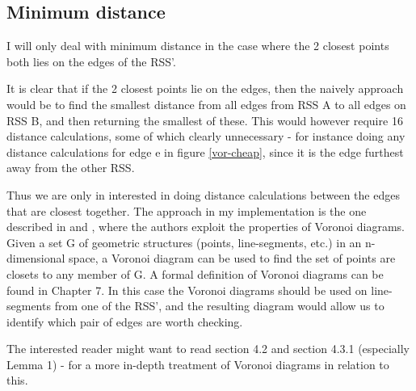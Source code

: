 \subsection{Minimum distance}
\label{minimumDistance}
I will only deal with minimum distance in the case where the 2 closest points both lies on the edges of the RSS'.

It is clear that if the 2 closest points lie on the edges, then the naively approach would be to find the smallest distance from all edges from RSS A to all edges on RSS B, and then returning the smallest of these. This would however require 16 distance calculations, some of which clearly unnecessary - for instance doing any distance calculations for edge e in figure \ref{vor-cheap}, since it is the edge furthest away from the other RSS. 

Thus we are only in interested in doing distance calculations between the edges that are closest together. The approach in my implementation is the one described in \cite{larsen00fast} and \cite{Larsen99fastproximity}, where the authors exploit the properties of Voronoi diagrams. Given a set G of geometric structures (points, line-segments, etc.) in an n-dimensional space, a Voronoi diagram can be used to find the set of points are closets to any member of G. A formal definition of Voronoi diagrams can be found in \cite{compgeom:2008} Chapter 7. In this case the Voronoi diagrams should be used on line-segments from one of the RSS', and the resulting diagram would allow us to identify which pair of edges are worth checking.

The interested reader might want to read \cite{larsen00fast} section 4.2 and \cite{Larsen99fastproximity} section 4.3.1 (especially Lemma 1) - for a more in-depth treatment of Voronoi diagrams in relation to this.

